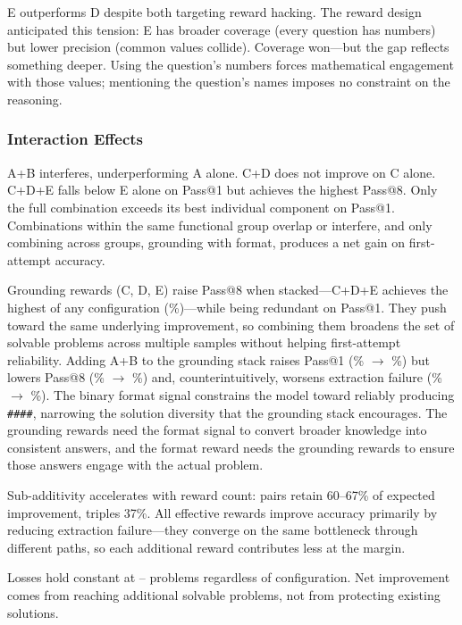 E outperforms D despite both targeting reward hacking.
The reward design anticipated this tension: E has broader coverage (every question has numbers) but lower precision (common values collide).
Coverage won---but the gap reflects something deeper.
Using the question's numbers forces mathematical engagement with those values; mentioning the question's names imposes no constraint on the reasoning.

\nestunindent
\subsubsection{Interaction Effects}
\nestindent

A+B interferes, underperforming A alone.
C+D does not improve on C alone.
C+D+E falls below E alone on Pass@1 but achieves the highest Pass@8.
Only the full combination exceeds its best individual component on Pass@1.
Combinations within the same functional group overlap or interfere, and only combining across groups, grounding with format, produces a net gain on first-attempt accuracy.

Grounding rewards (C, D, E) raise Pass@8 when stacked---C+D+E achieves the highest of any configuration (\pFourCombinedCdePassEight\%)---while being redundant on Pass@1.
They push toward the same underlying improvement, so combining them broadens the set of solvable problems across multiple samples without helping first-attempt reliability.
Adding A+B to the grounding stack raises Pass@1 (\pFourCombinedCdePassOne\% $\to$ \pFourCombinedAllPassOne\%) but lowers Pass@8 (\pFourCombinedCdePassEight\% $\to$ \pFourCombinedAllPassEight\%) and, counterintuitively, worsens extraction failure (\pFourCombinedCdeExtrFail\% $\to$ \pFourCombinedAllExtrFail\%).
The binary format signal constrains the model toward reliably producing \texttt{\#\#\#\#}, narrowing the solution diversity that the grounding stack encourages.
The grounding rewards need the format signal to convert broader knowledge into consistent answers, and the format reward needs the grounding rewards to ensure those answers engage with the actual problem.

Sub-additivity accelerates with reward count: pairs retain 60--67\% of expected improvement, triples 37\%.
All effective rewards improve accuracy primarily by reducing extraction failure---they converge on the same bottleneck through different paths, so each additional reward contributes less at the margin.

Losses hold constant at \pFourLossMin--\pFourLossMax{} problems regardless of configuration.
Net improvement comes from reaching additional solvable problems, not from protecting existing solutions.

